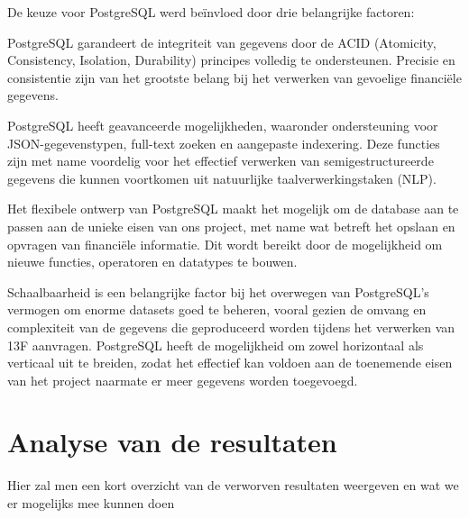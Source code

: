 De keuze voor PostgreSQL werd beïnvloed door drie belangrijke factoren:

PostgreSQL garandeert de integriteit van gegevens door de ACID (Atomicity, Consistency, Isolation, Durability) principes volledig te ondersteunen. Precisie en consistentie zijn van het grootste belang bij het verwerken van gevoelige financiële gegevens.

PostgreSQL heeft geavanceerde mogelijkheden, waaronder ondersteuning voor JSON-gegevenstypen, full-text zoeken en aangepaste indexering. Deze functies zijn met name voordelig voor het effectief verwerken van semigestructureerde gegevens die kunnen voortkomen uit natuurlijke taalverwerkingstaken (NLP).

Het flexibele ontwerp van PostgreSQL maakt het mogelijk om de database aan te passen aan de unieke eisen van ons project, met name wat betreft het opslaan en opvragen van financiële informatie. Dit wordt bereikt door de mogelijkheid om nieuwe functies, operatoren en datatypes te bouwen.

Schaalbaarheid is een belangrijke factor bij het overwegen van PostgreSQL's vermogen om enorme datasets goed te beheren, vooral gezien de omvang en complexiteit van de gegevens die geproduceerd worden tijdens het verwerken van 13F aanvragen. PostgreSQL heeft de mogelijkheid om zowel horizontaal als verticaal uit te breiden, zodat het effectief kan voldoen aan de toenemende eisen van het project naarmate er meer gegevens worden toegevoegd.

\section{Analyse van de resultaten}
Hier zal men een kort overzicht van de verworven resultaten weergeven en wat we er mogelijks mee kunnen doen
